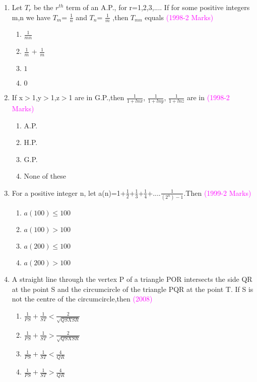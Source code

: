 \documentclass[journal,12pt,twocolumn]{IEEEtran}
\theoremstyle{remark}
\begin{document}
\begin{enumerate}
\item Let $T_r$ be the $r^{th}$ term of an A.P., for r=1,2,3,.... If for some positive integers m,n we have
$T_m$= $\frac{1}{n}$ and $T_n$= $\frac{1}{m}$ ,then $T_{mn}$ equals
\hfill\textcolor{magenta}{(1998-2 Marks)}
\begin{multicols}{2}
\begin{enumerate}
\item $\frac{1}{mn}$
\item $\frac{1}{m}$ + $\frac{1}{m}$
\item $1$
\item $0$
\end{enumerate}
\end{multicols}

\item If x$>$1,y$>$1,z$>$1 are in G.P.,then $\frac{1}{1+lnx}$, $\frac{1}{1+lny}$, $\frac{1}{1+lnz}$ are in 
\hfill\textcolor{magenta}{(1998-2 Marks)}
\begin{multicols}{2}
\begin{enumerate}
\item A.P.
\item H.P.
\item G.P.
\item None of these
\end{enumerate}
\end{multicols}

\item For a positive integer n, let
a(n)=1+$\frac{1}{2}$+$\frac{1}{3}$+$\frac{1}{4}$+....$\frac{1}{(2^n)-1}$.Then \hfill\textcolor{magenta}{(1999-2 Marks)}
\begin{multicols}{2}
\begin{enumerate}
\item $a(100)\leq 100$
\item $a(100) > 100$
\item $a(200)\leq 100$
\item $a(200) > 100$
\end{enumerate}
\end{multicols}

\item A straight line through the vertex P of a triangle POR intersects the side QR at the point S and the circumcircle of the triangle PQR at the point T. If S is not the centre of the circumcircle,then  \hfill\textcolor{magenta}{(2008)}
\begin{multicols}{2}
\begin{enumerate}
\item $\frac{1}{PS}+\frac{1}{ST}<\frac{2}{\sqrt{QSXSR}}$
\item $\frac{1}{PS}+\frac{1}{ST}>\frac{2}{\sqrt{QSXSR}}$
\item $\frac{1}{PS}+\frac{1}{ST}<\frac{4}{QR}$
\item $\frac{1}{PS}+\frac{1}{ST}>\frac{4}{QR}$
\end{enumerate}
\end{multicols}


\end{enumerate}
\end{document}
